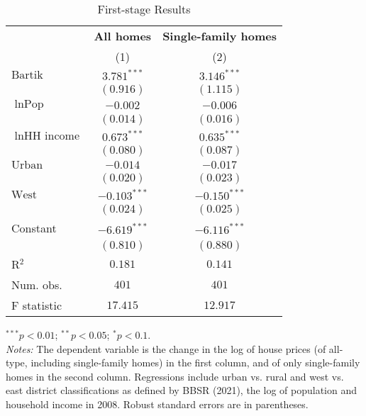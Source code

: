 
\begin{table}
\caption{First-stage Results}
\begin{center}
\begin{footnotesize}
\begin{threeparttable}
\begin{tabular}{l c c}
\toprule
 & \multicolumn{1}{c}{\textbf{All homes}} & \multicolumn{1}{c}{\textbf{Single-family homes}} \\
\cmidrule(lr){2-2} \cmidrule(lr){3-3}
 & (1) & (2) \\
\midrule
$\text{Bartik}$         & $3.781^{***}$  & $3.146^{***}$  \\
                        & $(0.916)$      & $(1.115)$      \\
$\ln{\text{Pop}}$       & $-0.002$       & $-0.006$       \\
                        & $(0.014)$      & $(0.016)$      \\
$\ln{\text{HH income}}$ & $0.673^{***}$  & $0.635^{***}$  \\
                        & $(0.080)$      & $(0.087)$      \\
$\text{Urban}$          & $-0.014$       & $-0.017$       \\
                        & $(0.020)$      & $(0.023)$      \\
$\text{West}$           & $-0.103^{***}$ & $-0.150^{***}$ \\
                        & $(0.024)$      & $(0.025)$      \\
Constant                & $-6.619^{***}$ & $-6.116^{***}$ \\
                        & $(0.810)$      & $(0.880)$      \\
\midrule
R$^2$                   & $0.181$        & $0.141$        \\
Num. obs.               & $401$          & $401$          \\
F statistic             & $17.415$       & $12.917$       \\
\bottomrule
\end{tabular}
\begin{tablenotes}[flushleft]
\tiny{\item $^{***}p<0.01$; $^{**}p<0.05$; $^{*}p<0.1$. \\ \textit{Notes:} The dependent variable is the change in the log of house prices (of all-type, including single-family homes) in the first column, and of only single-family homes in the second column. Regressions include urban vs. rural and west vs. east district classifications as defined by BBSR (2021), the log of population and household income in 2008. Robust standard errors are in parentheses.}
\end{tablenotes}
\end{threeparttable}
\end{footnotesize}
\label{tbl-first-stage-results-checked}
\end{center}
\end{table}

